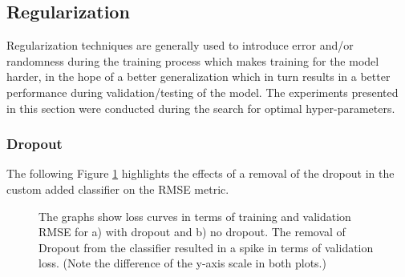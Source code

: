\subsection{Regularization}
Regularization techniques are generally used to introduce error and/or randomness during the training process which makes training for the model harder, in the hope of a better generalization which in turn results in a better performance during validation/testing of the model. The experiments presented in this section were conducted during the search for optimal hyper-parameters.

\subsubsection{Dropout}
The following Figure \ref{fig:AblationNoDropout} highlights the effects of a removal of the dropout in the custom added classifier on the RMSE metric.

\begin{figure}[H]
  \centering
  \hfill
  \caption[Ablation Study: Dropout loss curve]{The graphs show loss curves in terms of training and validation RMSE for a) with dropout and b) no dropout. The removal of Dropout from the classifier resulted in a spike in terms of validation loss. (Note the difference of the y-axis scale in both plots.)}
  \label{fig:AblationNoDropout}
\end{figure}

